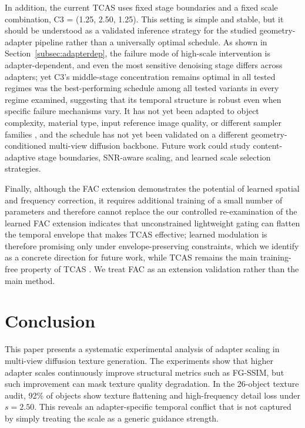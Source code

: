\documentclass[times,twocolumn,final]{elsarticle}
\providecommand{\DIFadd}[1]{{\protect\color{blue} \sf #1}} %
\providecommand{\DIFdel}[1]{{\protect\color{red} \scriptsize #1}} %
\providecommand{\DIFaddbegin}{} %
\providecommand{\DIFaddend}{} %
\providecommand{\DIFdelbegin}{} %
\providecommand{\DIFdelend}{} %
\newcommand{\DIFscaledelfig}{0.5}
\newlength{\DIFdelgraphicswidth} %
\newlength{\DIFdelgraphicsheight} %
\newcommand{\DIFaddincludegraphics}[2][]{{\color{blue}\fbox{\DIFOincludegraphics[#1]{#2}}}} %
\newcommand{\DIFdelincludegraphics}[2][]{%
\sbox{\DIFdelgraphicsbox}{\DIFOincludegraphics[#1]{#2}}%
\settoboxwidth{\DIFdelgraphicswidth}{\DIFdelgraphicsbox} %
\settoboxtotalheight{\DIFdelgraphicsheight}{\DIFdelgraphicsbox} %
\scalebox{\DIFscaledelfig}{%
\parbox[b]{\DIFdelgraphicswidth}{\usebox{\DIFdelgraphicsbox}\\[-\baselineskip] \rule{\DIFdelgraphicswidth}{0em}}\llap{\resizebox{\DIFdelgraphicswidth}{\DIFdelgraphicsheight}{%
\setlength{\unitlength}{\DIFdelgraphicswidth}%
\begin{picture}(1,1)%
\thicklines\linethickness{2pt} %
{\color[rgb]{1,0,0}\put(0,0){\framebox(1,1){}}}%
{\color[rgb]{1,0,0}\put(0,0){\line( 1,1){1}}}%
{\color[rgb]{1,0,0}\put(0,1){\line(1,-1){1}}}%
\end{picture}%
}\hspace*{3pt}}} %
} %
\DeclareRobustCommand{\DIFaddbegin}{\DIFOaddbegin \let\includegraphics\DIFaddincludegraphics} %
\DeclareRobustCommand{\DIFaddend}{\DIFOaddend \let\includegraphics\DIFOincludegraphics} %
\DeclareRobustCommand{\DIFdelbegin}{\DIFOdelbegin \let\includegraphics\DIFdelincludegraphics} %
\DeclareRobustCommand{\DIFdelend}{\DIFOaddend \let\includegraphics\DIFOincludegraphics} %
\begin{document}
In addition, the current TCAS uses fixed stage boundaries and a fixed scale combination, C3 = (1.25, 2.50, 1.25). This setting is simple and stable, but it should be understood as a validated inference strategy for the studied geometry-adapter pipeline rather than a universally optimal schedule. As shown in Section~\ref{subsec:adapterdep}, the failure mode of high-scale intervention is adapter-dependent, and even the most sensitive denoising stage differs across adapters; yet C3's middle-stage concentration \DIFdelbegin \DIFdel{remains optimal in all tested regimes}\DIFdelend \DIFaddbegin \DIFadd{was the best-performing schedule among all tested variants in every regime examined}\DIFaddend , suggesting that its temporal structure is robust even when specific failure mechanisms vary. It has not yet been adapted to object complexity, material type, input reference image quality, or different sampler families\DIFaddbegin \DIFadd{, and the schedule has not yet been validated on a different geometry-conditioned multi-view diffusion backbone}\DIFaddend . Future work could study content-adaptive stage boundaries, SNR-aware scaling, and learned scale selection strategies.

Finally, \DIFdelbegin \DIFdel{although the FAC extension demonstrates the potential of learned spatial and frequency correction, it requires additional training of a small number of parameters and therefore cannot replace the }\DIFdelend \DIFaddbegin \DIFadd{our controlled re-examination of the learned FAC extension indicates that unconstrained lightweight gating can flatten the temporal envelope that makes TCAS effective; learned modulation is therefore promising only under envelope-preserving constraints, which we identify as a concrete direction for future work, while TCAS remains the main }\DIFaddend training-free \DIFdelbegin \DIFdel{property of TCAS . We treat FAC as an extension validation rather than the main }\DIFdelend method.


\section{Conclusion}
\label{sec:conclusion}

This paper presents a systematic experimental analysis of adapter scaling in multi-view diffusion texture generation. The experiments show that higher adapter scales continuously improve structural metrics such as FG-SSIM, but such improvement can mask texture quality degradation. In the 26-object texture audit, 92\% of objects show texture flattening and high-frequency detail loss under $s = 2.50$. This reveals an adapter-specific temporal conflict that is not captured by simply treating the scale as a generic guidance strength.
\end{document}
